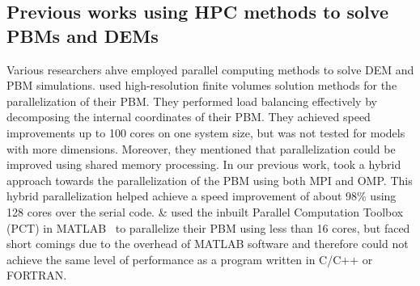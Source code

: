 \documentclass[preprint,11pt,authoryear]{elsarticle}
\newcommand{\gpnote}[1]{{\textcolor{green} {***giannis: #1}}}
\newcommand{\gpnote}[1]{}
\begin{document}

\subsection{Previous works using HPC methods to solve PBMs and DEMs}
Various researchers ahve employed parallel computing methods to solve DEM and PBM simulations. 
\cite{Gunawan2008} used high-resolution finite volumes solution methods for the parallelization 
of their PBM. They performed load 
balancing effectively by decomposing the internal coordinates of their PBM. They achieved 
speed improvements up to 100 cores on one system size, but was not tested for models 
with more dimensions. Moreover, they mentioned that parallelization could be 
improved using shared memory processing. 
In our previous work, \cite{Bettencourt2017} took a 
hybrid approach towards the parallelization of the PBM using both MPI and OMP. 
This hybrid parallelization helped achieve a speed improvement of about 98\% using 
128 cores over the serial code. \cite{Prakash2013a} \& \cite{Prakash2013b} used 
the inbuilt Parallel Computation Toolbox (PCT) in MATLAB~\citep{pctMatlab} to parallelize 
their PBM using less than 16 cores, but faced short comings due to the overhead 
of MATLAB software and therefore could not achieve the same level of performance 
as a program written in C/C++ or FORTRAN.  
\end{document}
